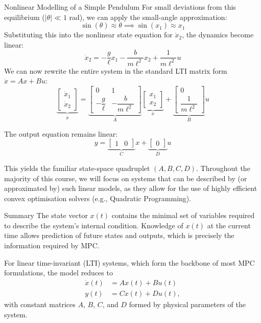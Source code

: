 \begin{examplebox}{Nonlinear Modelling of a Simple Pendulum}
	For small deviations from this equilibrium ($|\theta| \ll 1$ rad), we can apply the small-angle approximation:
	\[
	\sin(\theta) \approx \theta \implies \sin(x_1) \approx x_1
	\]
	Substituting this into the nonlinear state equation for $\dot{x}_2$, the dynamics become linear:
	\[
	\dot{x}_2 = -\frac{g}{\ell} x_1 - \frac{b}{m\ell^2} x_2 + \frac{1}{m\ell^2} u
	\]
	We can now rewrite the entire system in the standard LTI matrix form $\dot{x} = Ax + Bu$:
	\begin{equation}
		\underbrace{\begin{bmatrix} \dot{x}_1 \\ \dot{x}_2 \end{bmatrix}}_{\dot{x}}
		=
		\underbrace{\begin{bmatrix} 
				0 & 1 \\ 
				-\dfrac{g}{\ell} & -\dfrac{b}{m\ell^2} 
		\end{bmatrix}}_{A} 
		\underbrace{\begin{bmatrix} x_1 \\ x_2 \end{bmatrix}}_{x}
		+
		\underbrace{\begin{bmatrix} 
				0 \\ 
				\dfrac{1}{m\ell^2} 
		\end{bmatrix}}_{B} 
		u
	\end{equation}
	
	The output equation remains linear:
	\begin{equation}
		y = \underbrace{\begin{bmatrix} 1 & 0 \end{bmatrix}}_{C} x + \underbrace{\begin{bmatrix} 0 \end{bmatrix}}_{D} u
	\end{equation}
	
	This yields the familiar state-space quadruplet $(A, B, C, D)$. Throughout the majority of this course, we will focus on systems that can be described by (or approximated by) such linear models, as they allow for the use of highly efficient convex optimisation solvers (e.g., Quadratic Programming).
\end{examplebox}

\begin{notebox}{Summary}
The state vector $x(t)$ contains the minimal set of variables required to describe the system’s internal condition. Knowledge of $x(t)$ at the current time allows prediction of future states and outputs, which is precisely the information required by MPC.

For linear time-invariant (LTI) systems, which form the backbone of most MPC formulations, the model reduces to
\begin{align*}
\dot{x}(t) &= A x(t) + B u(t) \\
y(t) &= C x(t) + D u(t),
\end{align*}
with constant matrices $A$, $B$, $C$, and $D$ formed by physical parameters of the system.
\end{notebox}

